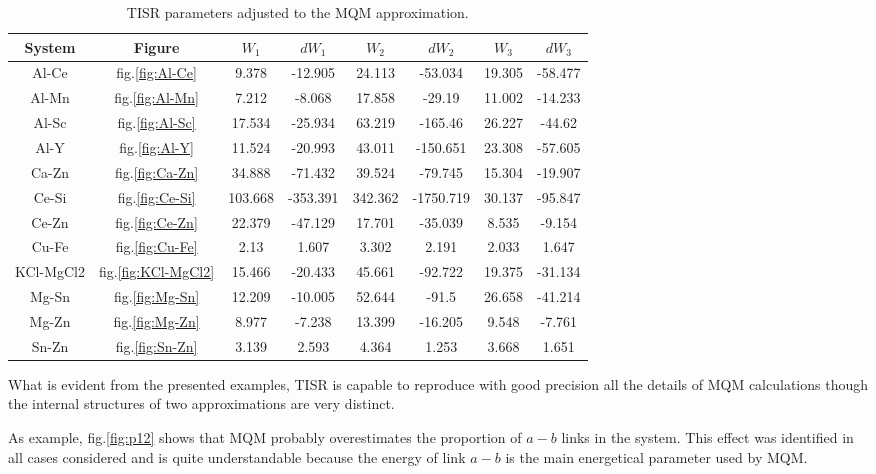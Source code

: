 \documentclass[12pt,abstract]{scrartcl}
\begin{document}
\begin{table}[ht]
  \begin{center}
    \caption{TISR parameters adjusted to the MQM approximation.}
    \label{tab:table1}
    \begin{tabular}{|c|c|SS|SS|SS|} %
	 \hline
      System &{Figure} & ${W_1}$ & ${dW_1}$ & ${W_2}$ & ${dW_2}$ & ${W_3}$ & ${dW_3}$\\
      \hline
Al-Ce & fig.\ref{fig:Al-Ce} & 9.378 & -12.905 & 24.113 & -53.034 & 19.305 & -58.477\\ \hline
Al-Mn & fig.\ref{fig:Al-Mn} & 7.212 & -8.068 & 17.858 & -29.19 & 11.002 & -14.233\\ \hline
Al-Sc & fig.\ref{fig:Al-Sc} & 17.534 & -25.934 & 63.219 & -165.46 & 26.227 & -44.62\\ \hline
Al-Y & fig.\ref{fig:Al-Y} & 11.524 & -20.993 & 43.011 & -150.651 & 23.308 & -57.605\\ \hline
Ca-Zn & fig.\ref{fig:Ca-Zn} & 34.888 & -71.432 & 39.524 & -79.745 & 15.304 & -19.907\\ \hline
Ce-Si & fig.\ref{fig:Ce-Si} & 103.668 & -353.391 & 342.362 & -1750.719 & 30.137 & -95.847\\ \hline
Ce-Zn & fig.\ref{fig:Ce-Zn} & 22.379 & -47.129 & 17.701 & -35.039 & 8.535 & -9.154\\ \hline
Cu-Fe & fig.\ref{fig:Cu-Fe} & 2.13 & 1.607 & 3.302 & 2.191 & 2.033 & 1.647\\ \hline
KCl-MgCl2 & fig.\ref{fig:KCl-MgCl2} & 15.466 & -20.433 & 45.661 & -92.722 & 19.375 & -31.134\\ \hline
Mg-Sn & fig.\ref{fig:Mg-Sn} & 12.209 & -10.005 & 52.644 & -91.5 & 26.658 & -41.214\\ \hline
Mg-Zn & fig.\ref{fig:Mg-Zn} & 8.977 & -7.238 & 13.399 & -16.205 & 9.548 & -7.761\\ \hline
Sn-Zn & fig.\ref{fig:Sn-Zn} & 3.139 & 2.593 & 4.364 & 1.253 & 3.668 & 1.651\\ \hline


    \end{tabular}
  \end{center}
\end{table}

What is evident from the presented examples, TISR is capable to reproduce with good precision  all the details of MQM calculations though the internal structures of two approximations are very distinct.

As example, fig.\ref{fig:p12} shows that MQM probably overestimates the proportion of  $a-b$ links in the system. This effect was identified in all cases considered and  is quite understandable because the energy of link $a-b$ is the main energetical parameter used by MQM. 
\end{document}
